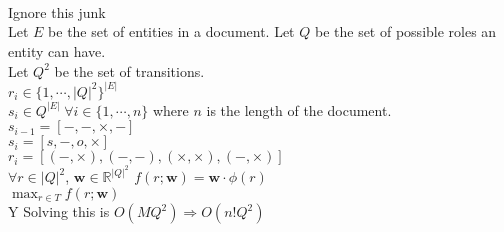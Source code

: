 \documentclass{article}
\newcommand{\entities}{E}
\newcommand{\roles}{Q}
\newcommand{\Tv}{T}
\newcommand{\sent}{s}
\newcommand{\weight}{\mathbf{w}}
\newcommand{\trans}{r}
\begin{document}
\\
\\
\\
\newpage
Ignore this junk\\
Let $\entities$ be the set of entities in a document.
Let $\roles$ be the set of possible roles an entity can have.\\
Let $\roles^2$ be the set of transitions.\\
$\trans_i \in \{1,\cdots, |\roles|^2\}^{|\entities|}$\\
$\sent_i \in \roles^{|\entities|}\;\forall i \in \{1,\cdots, n\}$ where $n$ is the length of the document.\\
$\sent_{i-1} = [-,-,\times,-]$\\ 
$\sent_{i} = [s,-,o,\times]$\\
$\trans_i = [(-,\times),(-,-),(\times,\times),(-,\times)]$\\ 
$\forall r \in |\roles|^2$, 
$\weight \in \mathbb{R}^{|\roles|^2}$
$f(\trans;\weight) = \weight \cdot \phi(\trans)$\\
$\max_{\trans \in \Tv} f(\trans ; \weight )$\\Y
Solving this is $O(M\roles^2) \Rightarrow O(n!\roles^2)$
\end{document}
